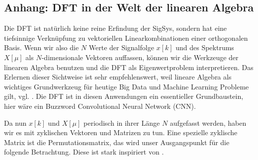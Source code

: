 














































\clearpage
\subsection*{Anhang: DFT in der Welt der linearen Algebra}
%
Die DFT ist natürlich keine reine Erfindung der SigSys, sondern hat eine
tiefsinnige Verknüpfung zu vektoriellen Linearkombinationen einer orthogonalen
Basis.
%
Wenn wir also die $N$ Werte der Signalfolge $x[k]$ und des Spektrums $X[\mu]$
als $N$-dimensionale Vektoren auffassen, können wir die Werkzeuge der linearen
Algebra benutzen und die DFT als Eigenwertproblem interpretieren.
%
Das Erlernen dieser Sichtweise ist sehr empfehlenswert,
weil lineare Algebra als wichtiges Grundwerkzeug für heutige
Big Data und Machine Learning Probleme gilt, vgl. \cite{Strang2019}.
%
Die DFT ist in diesen Anwendungen ein essentieller Grundbaustein, hier wäre
ein Buzzword Convolutional Neural Network (CNN).
%

Da nun $x[k]$ und $X[\mu]$ periodisch in ihrer Länge $N$ aufgefasst werden,
haben wir es mit zyklischen Vektoren und Matrizen zu tun.
%
Eine spezielle zyklische Matrix ist die Permutationsmatrix, das wird unser
Ausgangspunkt für die folgende Betrachtung.
Diese ist stark inspiriert von \cite{Strang2016, Strang2019}.
%

